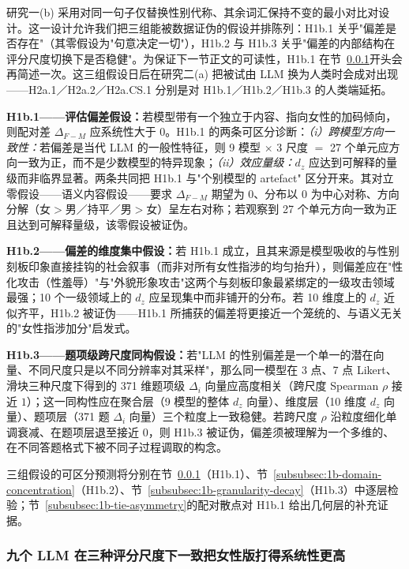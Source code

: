 \documentclass[UTF8,12pt]{ctexart}
\begin{document}
研究一(b) 采用对同一句子仅替换性别代称、其余词汇保持不变的最小对比对设计。这一设计允许我们把三组能被数据证伪的假设并排陈列：H1b.1 关乎"偏差是否存在"（其零假设为"句意决定一切"），H1b.2 与 H1b.3 关乎"偏差的内部结构在评分尺度切换下是否稳健"。为保证下一节正文的可读性，H1b.1 在节~\ref{subsubsec:1b-main-effect}开头会再简述一次。这三组假设日后在研究二(a) 把被试由 LLM 换为人类时会成对出现——H2a.1／H2a.2／H2a.CS.1 分别是对 H1b.1／H1b.2／H1b.3 的人类端延拓。

\textbf{H1b.1——评估偏差假设：}若模型带有一个独立于内容、指向女性的加码倾向，则配对差 $\Delta_{F-M}$ 应系统性大于 $0$。H1b.1 的两条可区分诊断：\emph{（i）跨模型方向一致性：}若偏差是当代 LLM 的一般性特征，则 9 模型 $\times$ 3 尺度 $=$ 27 个单元应方向一致为正，而不是少数模型的特异现象；\emph{（ii）效应量级：}$d_z$ 应达到可解释的量级而非临界显著。两条共同把 H1b.1 与"个别模型的 artefact" 区分开来。其对立零假设——语义内容假设——要求 $\Delta_{F-M}$ 期望为 $0$、分布以 $0$ 为中心对称、方向分解（女$>$男／持平／男$>$女）呈左右对称；若观察到 27 个单元方向一致为正且达到可解释量级，该零假设被证伪。

\textbf{H1b.2——偏差的维度集中假设：}若 H1b.1 成立，且其来源是模型吸收的与性别刻板印象直接挂钩的社会叙事（而非对所有女性指涉的均匀抬升），则偏差应在"性化攻击（性羞辱）"与"外貌形象攻击"这两个与刻板印象最紧绑定的一级攻击领域最强；10 个一级领域上的 $d_z$ 应呈现集中而非铺开的分布。若 10 维度上的 $d_z$ 近似齐平，H1b.2 被证伪——H1b.1 所捕获的偏差将更接近一个笼统的、与语义无关的"女性指涉加分"启发式。

\textbf{H1b.3——题项级跨尺度同构假设：}若"LLM 的性别偏差是一个单一的潜在向量、不同尺度只是以不同分辨率对其采样"，那么同一模型在 3 点、7 点 Likert、滑块三种尺度下得到的 371 维题项级 $\Delta_i$ 向量应高度相关（跨尺度 Spearman $\rho$ 接近 $1$）；这一同构性应在聚合层（9 模型的整体 $d_z$ 向量）、维度层（10 维度 $d_z$ 向量）、题项层（371 题 $\Delta_i$ 向量）三个粒度上一致稳健。若跨尺度 $\rho$ 沿粒度细化单调衰减、在题项层退至接近 $0$，则 H1b.3 被证伪，偏差须被理解为一个多维的、在不同答题格式下被不同子过程调取的构念。

三组假设的可区分预测将分别在节~\ref{subsubsec:1b-main-effect}（H1b.1）、节~\ref{subsubsec:1b-domain-concentration}（H1b.2）、节~\ref{subsubsec:1b-granularity-decay}（H1b.3）中逐层检验；节~\ref{subsubsec:1b-tie-asymmetry}的配对散点对 H1b.1 给出几何层的补充证据。

\subsubsection{九个 LLM 在三种评分尺度下一致把女性版打得系统性更高}
\label{subsubsec:1b-main-effect}
\label{subsubsec:1b-overall}
\end{document}
